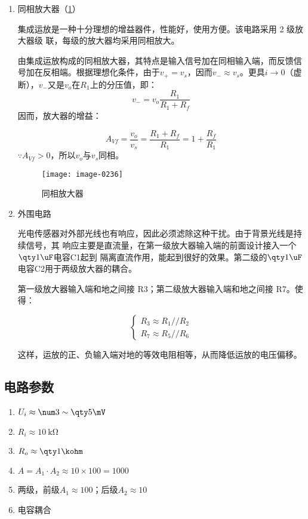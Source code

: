 \begin{enumerate}
  \item 同相放大器\cite{cn10}（\cref{4-3}）
  
  集成运放是一种十分理想的增益器件，性能好，使用方便。该电路采用 2 级放大器级
  联，每级的放大器均采用同相放大。

  由集成运放构成的同相放大器，其特点是输入信号加在同相输入端，而反馈信号加在反相端。根据理想化条件，由于$v_+=v_s$，因而$v_-\approx v_s$。更具$i\to0$（虚断），$v_-$又是$v_o$在$R_1$上的分压值，即：
  \begin{equation}
    v_-=v_o\frac{R_1}{R_1+R_f}
  \end{equation}
  因而，放大器的增益：
  
  \begin{equation}
    A_{Vf}=\frac{v_o}{v_s}=\frac{R_1+R_f}{R_1}=1+\frac{R_f}{R_1}
  \end{equation}
  $\because A_{Vf}>0$，所以$v_o$与$v_s$同相。
  
  \begin{figure}[htbp]
    \centering
    \texttt{[image: image-0236]}
    \caption{同相放大器}
    \label{4-3}
  \end{figure}
  \item 外围电路
  
  光电传感器对外部光线也有响应，因此必须滤除这种干扰。由于背景光线是持续信号，其
  响应主要是直流量，在第一级放大器输入端的前面设计接入一个$\qty1\uF$电容C1起到
  隔离直流作用，能起到很好的效果。第二级的$\qty1\uF$电容C2用于两级放大器的耦合。

  第一级放大器输入端和地之间接 R3；第二级放大器输入端和地之间接 R7。使得：

  \begin{equation}
    \begin{cases}
      R_3\approx R_1//R_2\\
      R_7\approx R_5//R_6
    \end{cases}
  \end{equation}

  这样，运放的正、负输入端对地的等效电阻相等，从而降低运放的电压偏移。
\end{enumerate}

\subsection{电路参数}

\begin{enumerate}
  \item {} $U_i\approx\num3\sim\qty5\mV$
  \item {} $R_i\approx\qty{10}\kohm$
  \item {} $R_o\approx\qty1\kohm$
  \item {} $A=A_1\cdot A_2\approx10\times100=1000$
  \item {} 两级，前级$A_1\approx100$；后级$A_2\approx10$
  \item {} 电容耦合
\end{enumerate}

